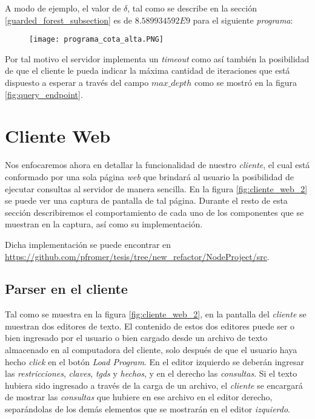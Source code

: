 \documentclass[11pt,a4paper,twoside]{tesis}
\begin{document}
A modo de ejemplo, el valor de $\delta$, tal como se describe en la sección \ref{guarded_forest_subsection} es de $8.589934592E9$ para el siguiente \textit{programa}:

\begin{figure}[ht]
    \texttt{[image: programa\_cota\_alta.PNG]}
    \centering
    \label{fig:programa_cota_alta}
\end{figure}

Por tal motivo el servidor implementa un \textit{timeout} como así también la posibilidad de que el cliente le pueda indicar la máxima cantidad de iteraciones que está dispuesto a esperar a través del campo \textit{$max\_depth$} como se mostró en la figura \ref{fig:query_endpoint}.  

\section{Cliente Web}

Nos enfocaremos ahora en detallar la funcionalidad de nuestro \textit{cliente}, el cual está conformado por una sola página \textit{web} que brindará al usuario la posibilidad de ejecutar consultas al servidor de manera sencilla. En la figura \ref{fig:cliente_web_2} se puede ver una captura de pantalla de tal página. Durante el resto de esta sección describiremos el comportamiento de cada uno de los componentes que se muestran en la captura, así como su implementación.

Dicha implementación se puede encontrar en \url{https://github.com/pfromer/tesis/tree/new_refactor/NodeProject/src}.

\subsection{Parser en el cliente}

Tal como se muestra en la figura \ref{fig:cliente_web_2}, en la pantalla del \textit{cliente} se muestran dos editores de texto. El contenido de estos dos editores puede ser o bien ingresado por el usuario o bien cargado desde un archivo de texto almacenado en al computadora del cliente, solo después de que el usuario haya hecho \textit{click} en el botón \textit{Load Program}. En el editor izquierdo se deberán ingresar las \textit{restricciones}, \textit{claves}, \textit{tgds} y \textit{hechos}, y en el derecho las \textit{consultas}. Si el texto hubiera sido ingresado a través de la carga de un archivo, el \textit{cliente} se encargará de mostrar las \textit{consultas} que hubiere en ese archivo en el editor derecho, separándolas de los demás elementos que se mostrarán en el editor \textit{izquierdo}. 
\end{document}

